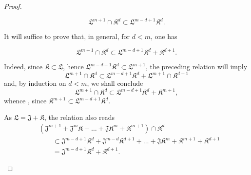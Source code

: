 \begin{proof}
\begin{env}[19.7.1.13]
\label{IV.19.7.1.13}
\[
  \mathfrak{L}^{m+1}\cap\mathfrak{K}^d\subset\mathfrak{L}^{m-d+1}\mathfrak{K}^d.
\]
\end{env}

It will suffice to prove that, in general, for $d<m$, one has

\begin{env}[19.7.1.14]
\label{IV.19.7.1.14}
\[
  \mathfrak{L}^{m+1}\cap\mathfrak{K}^d\subset\mathfrak{L}^{m-d+1}\mathfrak{K}^d+\mathfrak{K}^{d+1}.
\]
\end{env}

Indeed, since $\mathfrak{K}\subset\mathfrak{L}$, hence $\mathfrak{L}^{m-d+1}\mathfrak{K}^d\subset\mathfrak{L}^{m+1}$, the preceding relation will imply
\[
  \mathfrak{L}^{m+1}\cap\mathfrak{K}^d\subset\mathfrak{L}^{m-d+1}\mathfrak{K}^d+\mathfrak{L}^{m+1}\cap\mathfrak{K}^{d+1}
\]
and, by induction on $d<m$, we shall conclude
\[
  \mathfrak{L}^{m+1}\cap\mathfrak{K}^d
  \subset\mathfrak{L}^{m-d+1}\mathfrak{K}^d+\mathfrak{K}^{m+1},
\]
whence , since $\mathfrak{K}^{m+1}\subset\mathfrak{L}^{m-d+1}\mathfrak{K}^d$.

\begin{env}[19.7.1.15]
\label{IV.19.7.1.15}
As $\mathfrak{L}=\mathfrak{J}+\mathfrak{K}$, the relation  also reads
\[
\begin{aligned}
  &(\mathfrak{J}^{m+1}+\mathfrak{J}^m\mathfrak{K}+\ldots+\mathfrak{J}\mathfrak{K}^m+\mathfrak{K}^{m+1})\cap\mathfrak{K}^d\\
  &\qquad\subset\mathfrak{J}^{m-d+1}\mathfrak{K}^d+\mathfrak{J}^{m-d}\mathfrak{K}^{d+1}+\ldots+\mathfrak{J}\mathfrak{K}^m+\mathfrak{K}^{m+1}+\mathfrak{K}^{d+1}\\
  &\qquad=\mathfrak{J}^{m-d+1}\mathfrak{K}^d+\mathfrak{K}^{d+1}.
\end{aligned}
\]


\end{env}
\end{proof}
